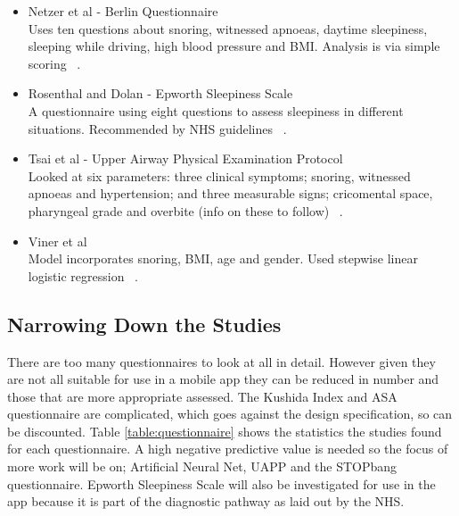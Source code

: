\begin{itemize}
\item Netzer et al - Berlin Questionnaire \\
Uses ten questions about snoring, witnessed apnoeas, daytime sleepiness, sleeping while driving, high blood pressure and BMI. Analysis is via simple scoring ~\cite{netzer1999using}.
\item Rosenthal and Dolan - Epworth Sleepiness Scale \\
A questionnaire using eight questions to assess sleepiness in different situations. Recommended by NHS guidelines ~\cite{rosenthal2008epworth}.
\item Tsai et al - Upper Airway Physical Examination Protocol \\
Looked at six parameters: three clinical symptoms; snoring, witnessed apnoeas and hypertension; and three measurable signs; cricomental space, pharyngeal grade and overbite (info on these to follow) ~\cite{tsai2003decision}.
\item Viner et al\\ 
Model incorporates snoring, BMI, age and gender. Used stepwise linear logistic regression ~\cite{viner1991history}.
\end{itemize}

\subsection{Narrowing Down the Studies}
There are too many questionnaires to look at all in detail. However given they are not all suitable for use in a mobile app they can be reduced in number and those that are more appropriate assessed. The Kushida Index and ASA questionnaire are complicated, which goes against the design specification, so can be discounted. Table \ref{table:questionnaire} shows the statistics the studies found for each questionnaire. A high negative predictive value is needed so the focus of more work will be on; Artificial Neural Net, UAPP and the STOPbang questionnaire. Epworth Sleepiness Scale will also be investigated for use in the app because it is part of the diagnostic pathway as laid out by the NHS.

